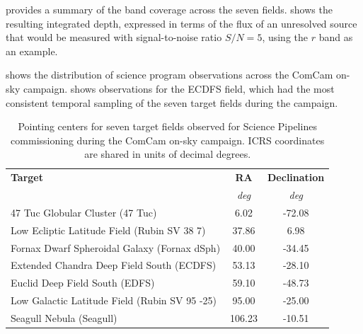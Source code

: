  provides a summary of the band coverage across the seven fields.
 shows the resulting integrated depth, expressed in terms of the flux of an unresolved source that would be measured with signal-to-noise ratio $S/N = 5$, using the $r$ band as an example.

 shows the distribution of science program observations across the ComCam on-sky campaign.
 shows observations for the ECDFS field, which had the most consistent temporal sampling of the seven target fields during the campaign.









\begin{table}
    \centering
    \begin{tabular}{@{}lcc@{}}
    \textbf{Target} & \textbf{RA} & \textbf{Declination} \\
     & \textit{deg} & \textit{deg} \\
    \hline
    47 Tuc Globular Cluster (47 Tuc)              & 6.02    & -72.08    \\
    Low Ecliptic Latitude Field (Rubin SV 38 7)   & 37.86   & 6.98      \\
    Fornax Dwarf Spheroidal Galaxy (Fornax dSph)  & 40.00   & -34.45    \\
    Extended Chandra Deep Field South (ECDFS)     & 53.13   & -28.10    \\
    Euclid Deep Field South (EDFS)                & 59.10   & -48.73    \\
    Low Galactic Latitude Field (Rubin SV 95 -25) & 95.00   & -25.00    \\
    Seagull Nebula (Seagull)                      & 106.23  & -10.51    \\
    \end{tabular}
    \caption{Pointing centers for seven target fields observed for Science Pipelines commissioning during the ComCam on-sky campaign. ICRS coordinates are shared in units of decimal degrees.}
    \label{tab:target_fields_pointing_centers}
\end{table}


